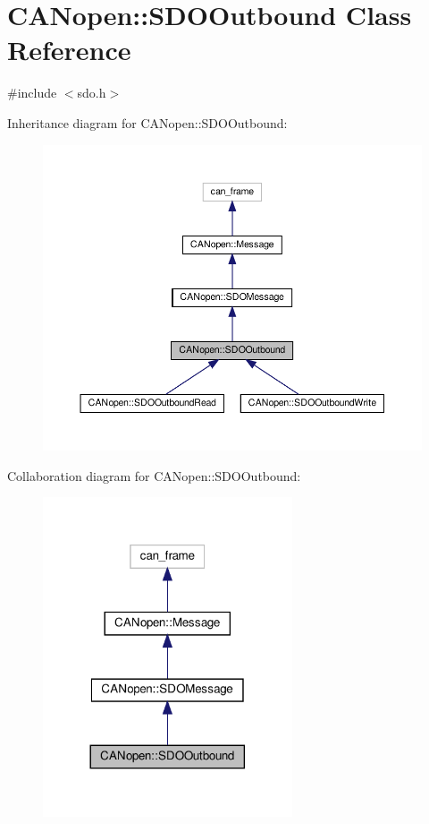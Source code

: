 \hypertarget{class_c_a_nopen_1_1_s_d_o_outbound}{}\section{C\+A\+Nopen\+:\+:S\+D\+O\+Outbound Class Reference}
\label{class_c_a_nopen_1_1_s_d_o_outbound}


{\ttfamily \#include $<$sdo.\+h$>$}



Inheritance diagram for C\+A\+Nopen\+:\+:S\+D\+O\+Outbound\+:\nopagebreak
\begin{figure}[H]
\begin{center}
\leavevmode
\includegraphics[width=350pt]{class_c_a_nopen_1_1_s_d_o_outbound__inherit__graph}
\end{center}
\end{figure}


Collaboration diagram for C\+A\+Nopen\+:\+:S\+D\+O\+Outbound\+:\nopagebreak
\begin{figure}[H]
\begin{center}
\leavevmode
\includegraphics[width=209pt]{class_c_a_nopen_1_1_s_d_o_outbound__coll__graph}
\end{center}
\end{figure}
